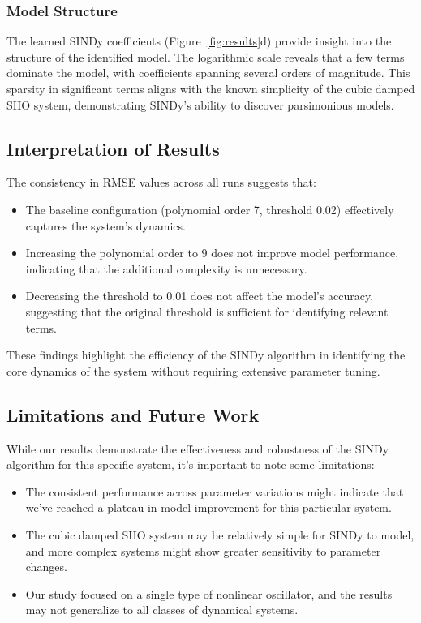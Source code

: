\documentclass{article} %
\begin{document}
\subsubsection{Model Structure}
The learned SINDy coefficients (Figure~\ref{fig:results}d) provide insight into the structure of the identified model. The logarithmic scale reveals that a few terms dominate the model, with coefficients spanning several orders of magnitude. This sparsity in significant terms aligns with the known simplicity of the cubic damped SHO system, demonstrating SINDy's ability to discover parsimonious models.

\subsection{Interpretation of Results}

The consistency in RMSE values across all runs suggests that:

\begin{itemize}
    \item The baseline configuration (polynomial order 7, threshold 0.02) effectively captures the system's dynamics.
    \item Increasing the polynomial order to 9 does not improve model performance, indicating that the additional complexity is unnecessary.
    \item Decreasing the threshold to 0.01 does not affect the model's accuracy, suggesting that the original threshold is sufficient for identifying relevant terms.
\end{itemize}

These findings highlight the efficiency of the SINDy algorithm in identifying the core dynamics of the system without requiring extensive parameter tuning.

\subsection{Limitations and Future Work}

While our results demonstrate the effectiveness and robustness of the SINDy algorithm for this specific system, it's important to note some limitations:

\begin{itemize}
    \item The consistent performance across parameter variations might indicate that we've reached a plateau in model improvement for this particular system.
    \item The cubic damped SHO system may be relatively simple for SINDy to model, and more complex systems might show greater sensitivity to parameter changes.
    \item Our study focused on a single type of nonlinear oscillator, and the results may not generalize to all classes of dynamical systems.
\end{itemize}
\end{document}

